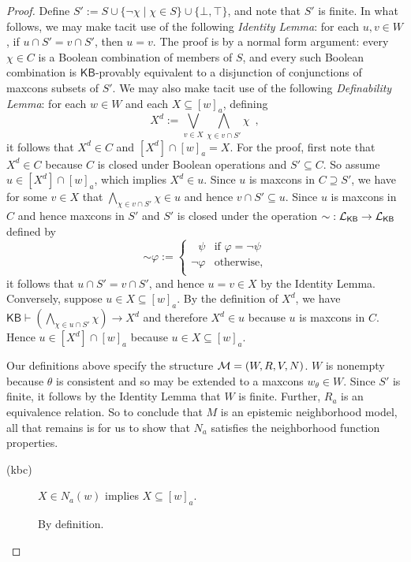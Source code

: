 \documentclass[12pt]{article}
\theoremstyle{definition}
\newcommand{\M}{{\cal M}}      %
\newcommand{\Lang}{{\cal L}}   %
\newcommand{\KB}{{\mathsf{KB}}}                        %
\begin{document}
\begin{proof}
  Define $S':=S\cup\{\lnot\chi\mid\chi\in S\}\cup\{\bot,\top\}$, and
  note that $S'$ is finite.  In what follows, we may make tacit use of
  the following \emph{Identity Lemma\/}: for each $u,v\in W$, if
  $u\cap S'=v\cap S'$, then $u=v$.  The proof is by a normal form
  argument: every $\chi\in C$ is a Boolean combination of members of
  $S$, and every such Boolean combination is $\KB$-provably equivalent
  to a disjunction of conjunctions of maxcons subsets of $S'$.  We may
  also make tacit use of the following \emph{Definability Lemma\/}:
  for each $w\in W$ and each $X\subseteq[w]_a$, defining
  \[
  \textstyle
  X^d :=\bigvee_{v\in X}\bigwedge_{\chi\in v\cap S'} \chi\enspace,
  \]
  it follows that $X^d\in C$ and $[X^d]\cap[w]_a=X$. For the proof,
  first note that $X^d\in C$ because $C$ is closed under Boolean
  operations and $S'\subseteq C$.  So assume $u\in[X^d]\cap[w]_a$,
  which implies $X^d\in u$.  Since $u$ is maxcons in $C\supseteq S'$,
  we have for some $v\in X$ that $\bigwedge_{\chi\in v\cap S'}\chi\in
  u$ and hence $v\cap S'\subseteq u$.  Since $u$ is maxcons in $C$ and
  hence maxcons in $S'$ and $S'$ is closed under the operation
  ${\sim}:\Lang_\KB\to\Lang_\KB$ defined by
  \[
  {\sim}\varphi :=
  \begin{cases}
    \phantom{\lnot}\psi & \text{if }\varphi=\lnot\psi\\
    \lnot\varphi & \text{otherwise,} \\
  \end{cases}
  \]
  it follows that $u\cap S'=v\cap S'$, and hence $u=v\in X$ by the
  Identity Lemma.  Conversely, suppose $u\in X\subseteq[w]_a$.  By the
  definition of $X^d$, we have $\KB\vdash(\bigwedge_{\chi\in u\cap
    S'}\chi)\to X^d$ and therefore $X^d\in u$ because $u$ is maxcons
  in $C$. Hence $u\in[X^d]\cap[w]_a$ because $u\in X\subseteq[w]_a$.

  Our definitions above specify the structure $\M=(W,R,V,N)$.  $W$ is
  nonempty because $\theta$ is consistent and so may be extended to a
  maxcons $w_\theta\in W$.  Since $S'$ is finite, it follows by the
  Identity Lemma that $W$ is finite.  Further, $R_a$ is an equivalence
  relation. So to conclude that $M$ is an epistemic neighborhood
  model, all that remains is for us to show that $N_a$ satisfies the
  neighborhood function properties.
  \begin{description}
  \item[(kbc)] $X\in N_a(w)$ implies $X\subseteq[w]_a$.

    By definition.


\end{description}
\end{proof}
\end{document}
